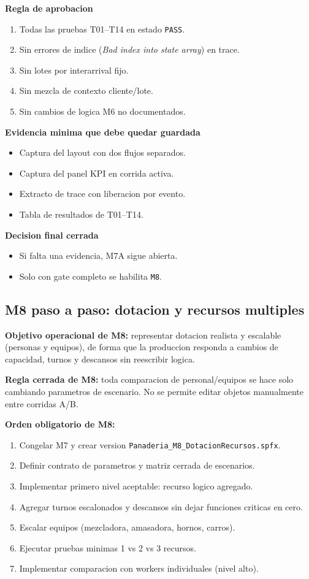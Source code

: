 \documentclass[11pt]{article}
\newcommand{\simio}[1]{\texttt{#1}}
\begin{document}
\textbf{Regla de aprobacion}
\begin{enumerate}
  \item Todas las pruebas T01--T14 en estado \simio{PASS}.
  \item Sin errores de indice (\textit{Bad index into state array}) en trace.
  \item Sin lotes por interarrival fijo.
  \item Sin mezcla de contexto cliente/lote.
  \item Sin cambios de logica M6 no documentados.
\end{enumerate}

\textbf{Evidencia minima que debe quedar guardada}
\begin{itemize}
  \item Captura del layout con dos flujos separados.
  \item Captura del panel KPI en corrida activa.
  \item Extracto de trace con liberacion por evento.
  \item Tabla de resultados de T01--T14.
\end{itemize}

\textbf{Decision final cerrada}
\begin{itemize}
  \item Si falta una evidencia, M7A sigue abierta.
  \item Solo con gate completo se habilita \simio{M8}.
\end{itemize}

\subsection{M8 paso a paso: dotacion y recursos multiples}
\textbf{Objetivo operacional de M8:} representar dotacion realista y escalable (personas y equipos), de forma que la produccion responda a cambios de capacidad, turnos y descansos sin reescribir logica.

\textbf{Regla cerrada de M8:} toda comparacion de personal/equipos se hace solo cambiando parametros de escenario. No se permite editar objetos manualmente entre corridas A/B.

\textbf{Orden obligatorio de M8:}
\begin{enumerate}
  \item Congelar M7 y crear version \simio{Panaderia\_M8\_DotacionRecursos.spfx}.
  \item Definir contrato de parametros y matriz cerrada de escenarios.
  \item Implementar primero nivel aceptable: recurso logico agregado.
  \item Agregar turnos escalonados y descansos sin dejar funciones criticas en cero.
  \item Escalar equipos (mezcladora, amasadora, hornos, carros).
  \item Ejecutar pruebas minimas 1 vs 2 vs 3 recursos.
  \item Implementar comparacion con workers individuales (nivel alto).
\end{enumerate}
\end{document}
